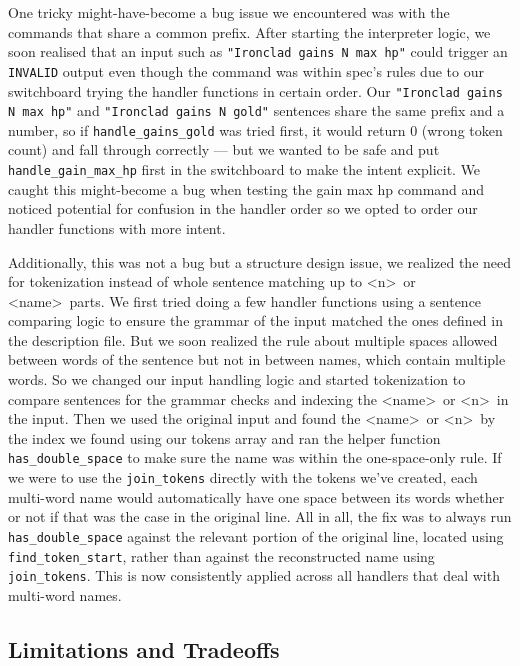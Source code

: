 \documentclass[12pt,a4paper]{article}
\begin{document}
One tricky might-have-become a bug issue we encountered was with the commands that share a common prefix. After starting the interpreter logic, we soon realised that an input such as \texttt{"Ironclad gains N max hp"} could trigger an \texttt{INVALID} output even though the command was within spec's rules due to our switchboard trying the handler functions in certain order. Our \texttt{"Ironclad gains N max hp"} and \texttt{"Ironclad gains N gold"} sentences share the same prefix and a number, so if \texttt{handle\_gains\_gold} was tried first, it would return 0 (wrong token count) and fall through correctly --- but we wanted to be safe and put \texttt{handle\_gain\_max\_hp} first in the switchboard to make the intent explicit. We caught this might-become a bug when testing the gain max hp command and noticed potential for confusion in the handler order so we opted to order our handler functions with more intent.

Additionally, this was not a bug but a structure design issue, we realized the need for tokenization instead of whole sentence matching up to \textless n\textgreater\ or \textless name\textgreater\ parts. We first tried doing a few handler functions using a sentence comparing logic to ensure the grammar of the input matched the ones defined in the description file. But we soon realized the rule about multiple spaces allowed between words of the sentence but not in between names, which contain multiple words. So we changed our input handling logic and started tokenization to compare sentences for the grammar checks and indexing the \textless name\textgreater\ or \textless n\textgreater\ in the input. Then we used the original input and found the \textless name\textgreater\ or \textless n\textgreater\ by the index we found using our tokens array and ran the helper function \texttt{has\_double\_space} to make sure the name was within the one-space-only rule. If we were to use the \texttt{join\_tokens} directly with the tokens we've created, each multi-word name would automatically have one space between its words whether or not if that was the case in the original line. All in all, the fix was to always run \texttt{has\_double\_space} against the relevant portion of the original line, located using \texttt{find\_token\_start}, rather than against the reconstructed name using \texttt{join\_tokens}. This is now consistently applied across all handlers that deal with multi-word names.

\subsection{Limitations and Tradeoffs}
\end{document}
